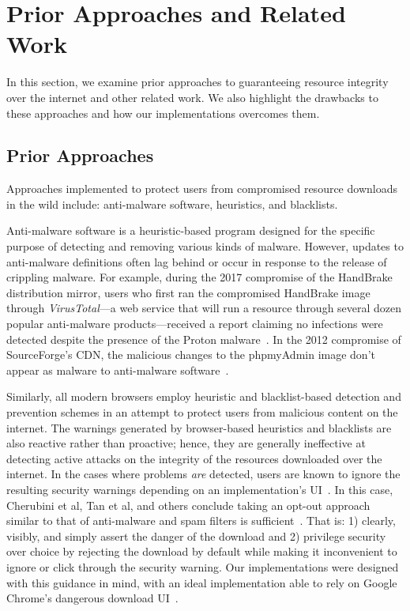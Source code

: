 \section{Prior Approaches and Related Work} \label{sec:related}

In this section, we examine prior approaches to guaranteeing resource integrity
over the internet and other related work. We also highlight the drawbacks to
these approaches and how our \SYSTEM{} implementations overcomes them.

\subsection{Prior Approaches}

Approaches implemented to protect users from compromised resource downloads in
the wild include: anti-malware software, heuristics, and blacklists.

Anti-malware software is a heuristic-based program designed for the specific
purpose of detecting and removing various kinds of malware. However, updates to
anti-malware definitions often lag behind or occur in response to the release of
crippling malware. For example, during the 2017 compromise of the HandBrake
distribution mirror, users who first ran the compromised HandBrake image through
\textit{VirusTotal}---a web service that will run a resource through several
dozen popular anti-malware products---received a report claiming no infections
were detected despite the presence of the Proton malware~\cite{SCA-HB1}. In the
2012 compromise of SourceForge's CDN, the malicious changes to the phpmyAdmin
image don't appear as malware to anti-malware software~\cite{SCA-PMA1}.

Similarly, all modern browsers employ heuristic and blacklist-based detection
and prevention schemes in an attempt to protect users from malicious content on
the internet. The warnings generated by browser-based heuristics and blacklists
are also reactive rather than proactive; hence, they are generally ineffective
at detecting active attacks on the integrity of the resources downloaded over
the internet. In the cases where problems \emph{are} detected, users are known
to ignore the resulting security warnings depending on an implementation's
UI~\cite{Clickthrough, Modic, Akhawe, ChromeClickThrough}. In this case,
Cherubini et al, Tan et al, and others conclude taking an opt-out approach
similar to that of anti-malware and spam filters is sufficient~\cite{Cherubini,
Tan}. That is: 1) clearly, visibly, and simply assert the danger of the download
and 2) privilege security over choice by rejecting the download by default while
making it inconvenient to ignore or click through the security warning. Our
\SYSTEM{} implementations were designed with this guidance in mind, with an
ideal implementation able to rely on Google Chrome's dangerous download
UI~\cite{ChromeClickThrough}.

